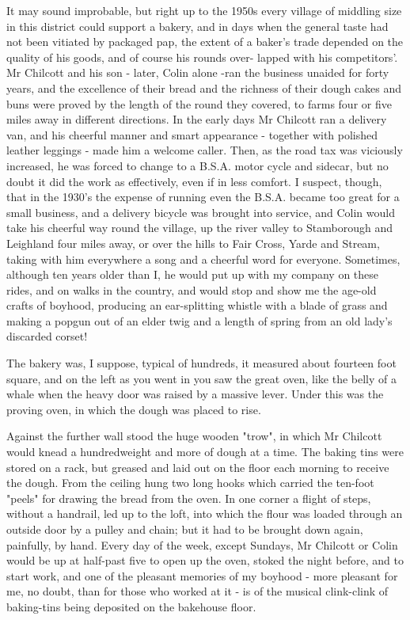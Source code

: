 It may sound improbable, but right up to the 1950s every village of middling size in this district could support a bakery, and in days when the general taste had not been vitiated by packaged pap, the extent of a baker's trade depended on the quality of his goods, and of course his rounds over- lapped with his competitors'. Mr Chilcott and his son - later, Colin alone -ran the business unaided for forty years, and the excellence of their bread and the richness of their dough cakes and buns were proved by the length of the round they covered, to farms four or five miles away in different directions. In the early days Mr Chilcott ran a delivery van, and his cheerful manner and smart appearance - together with polished leather leggings - made him a welcome caller. Then, as the road tax was viciously increased, he was forced to change to a B.S.A. motor cycle and sidecar, but no doubt it did the work as effectively, even if in less comfort. I suspect, though, that in the 1930's the expense of running even the B.S.A. became too great for a small business, and a delivery bicycle was brought into service, and Colin would take his cheerful way round the village, up the river valley to Stamborough and Leighland four miles away, or over the hills to Fair Cross, Yarde and Stream, taking with him everywhere a song and a cheerful word for everyone. Sometimes, although ten years older than I, he would put up with my company on these rides, and on walks in the country, and would stop and show me the age-old crafts of boyhood, producing an ear-splitting whistle with a blade of grass and making a popgun out of an elder twig and a length of spring from an old lady's discarded corset!

The bakery was, I suppose, typical of hundreds, it measured about fourteen foot square, and on the left as you went in you saw the great oven, like the belly of a whale when the heavy door was raised by a massive lever. Under this was the proving oven, in which the dough was placed to rise.

Against the further wall stood the huge wooden "trow", in which Mr Chilcott would knead a hundredweight and more of dough at a time. The baking tins were stored on a rack, but greased and laid out on the floor each morning to receive the dough. From the ceiling hung two long hooks which carried the ten-foot "peels" for drawing the bread from the oven. In one corner a flight of steps, without a handrail, led up to the loft, into which the flour was loaded through an outside door by a pulley and chain; but it had to be brought down again, painfully, by hand. Every day of the week, except Sundays, Mr Chilcott or Colin would be up at half-past five to open up the oven, stoked the night before, and to start work, and one of the pleasant memories of my boyhood - more pleasant for me, no doubt, than for those who worked at it - is of the musical clink-clink of baking-tins being deposited on the bakehouse floor.

